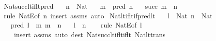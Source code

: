 \begin{isabellebody}
\endisatagproof
{\isafoldproof}%
%
\isadelimproof
\isanewline
%
\endisadelimproof
\isanewline
{}\isamarkupfalse%
\ Nat{\isacharunderscore}{\kern0pt}succ{\isacharunderscore}{\kern0pt}lt{\isacharunderscore}{\kern0pt}if{\isacharunderscore}{\kern0pt}lt{\isacharunderscore}{\kern0pt}pred{\isacharcolon}{\kern0pt}\isanewline
\ \ \ {\isachardoublequoteopen}n\ {\isacharcolon}{\kern0pt}\ Nat{\isachardoublequoteclose}\isanewline
\ \ \ {\isachardoublequoteopen}m\ {\isacharless}{\kern0pt}\ pred\ n{\isachardoublequoteclose}\isanewline
\ \ \ {\isachardoublequoteopen}succ\ m\ {\isacharless}{\kern0pt}\ n{\isachardoublequoteclose}\isanewline
%
\isadelimproof
\ \ %
\endisadelimproof
%
\isatagproof
{}\isamarkupfalse%
\ {\isacharparenleft}{\kern0pt}rule\ NatE{\isacharbrackleft}{\kern0pt}of\ n{\isacharbrackright}{\kern0pt}{\isacharparenright}{\kern0pt}\ {\isacharparenleft}{\kern0pt}insert\ assms{\isacharcomma}{\kern0pt}\ auto{\isacharparenright}{\kern0pt}%
\endisatagproof
{\isafoldproof}%
%
\isadelimproof
\isanewline
%
\endisadelimproof
\isanewline
{}\isamarkupfalse%
\ Nat{\isacharunderscore}{\kern0pt}lt{\isacharunderscore}{\kern0pt}if{\isacharunderscore}{\kern0pt}lt{\isacharunderscore}{\kern0pt}if{\isacharunderscore}{\kern0pt}pred{\isacharunderscore}{\kern0pt}lt{\isacharcolon}{\kern0pt}\isanewline
\ \ \ {\isachardoublequoteopen}l\ {\isacharcolon}{\kern0pt}\ Nat{\isachardoublequoteclose}\ {\isachardoublequoteopen}n\ {\isacharcolon}{\kern0pt}\ Nat{\isachardoublequoteclose}\isanewline
\ \ \ {\isachardoublequoteopen}pred\ l\ {\isacharless}{\kern0pt}\ m{\isachardoublequoteclose}\ {\isachardoublequoteopen}m\ {\isacharless}{\kern0pt}\ n{\isachardoublequoteclose}\isanewline
\ \ \ {\isachardoublequoteopen}l\ {\isacharless}{\kern0pt}\ n{\isachardoublequoteclose}\isanewline
%
\isadelimproof
\ \ %
\endisadelimproof
%
\isatagproof
{}\isamarkupfalse%
\ {\isacharparenleft}{\kern0pt}rule\ NatE{\isacharbrackleft}{\kern0pt}of\ l{\isacharbrackright}{\kern0pt}{\isacharparenright}{\kern0pt}\isanewline
\ \ \ \ {\isacharparenleft}{\kern0pt}insert\ assms{\isacharcomma}{\kern0pt}\ auto\ dest{\isacharcolon}{\kern0pt}\ Nat{\isacharunderscore}{\kern0pt}succ{\isacharunderscore}{\kern0pt}lt{\isacharunderscore}{\kern0pt}if{\isacharunderscore}{\kern0pt}lt{\isacharunderscore}{\kern0pt}if{\isacharunderscore}{\kern0pt}lt\ Nat{\isacharunderscore}{\kern0pt}lt{\isacharunderscore}{\kern0pt}trans{\isacharparenright}{\kern0pt}%
\endisatagproof
{\isafoldproof}%

\end{isabellebody}
